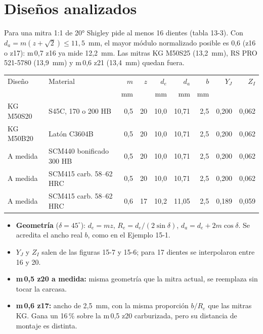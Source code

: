 \documentclass[11pt,a4paper]{article}
\begin{document}
\section{Diseños analizados}
Para una mitra 1:1 de 20° Shigley pide al menos 16 dientes (tabla 13-3). Con $d_a=m(z+\sqrt2)\le11{,}5$~mm,
el mayor módulo normalizado posible es 0,6 (z16 o z17): m\,0,7 z16 ya mide 12,2~mm. Las mitras KG M50S25 (13,2~mm),
RS PRO 521-5780 (13,9~mm) y m\,0,6 z21 (13,4~mm) quedan fuera.

\begin{table}[H]\centering\small\setlength{\tabcolsep}{4pt}
\begin{tabular}{l l r r r r r r r}
\toprule
Diseño & Material & $m$ & $z$ & $d_e$ & $d_a$ & $b$ & $Y_J$ & $Z_I$\\
 & & mm & & mm & mm & mm & & \\
\midrule
KG M50S20 & S45C, 170 o 200 HB & 0,5 & 20 & 10,0 & 10,71 & 2,5 & 0,200 & 0,062\\
KG M50B20 & Latón C3604B & 0,5 & 20 & 10,0 & 10,71 & 2,5 & 0,200 & 0,062\\
A medida & SCM440 bonificado 300 HB & 0,5 & 20 & 10,0 & 10,71 & 2,5 & 0,200 & 0,062\\
A medida & SCM415 carb. 58--62 HRC & 0,5 & 20 & 10,0 & 10,71 & 2,5 & 0,200 & 0,062\\
A medida & SCM415 carb. 58--62 HRC & 0,6 & 17 & 10,2 & 11,05 & 2,5 & 0,189 & 0,059\\
\bottomrule
\end{tabular}
\end{table}

\begin{itemize}
  \item \textbf{Geometría} ($\delta=45^\circ$): $d_e=mz$, $R_e=d_e/(2\sin\delta)$, $d_a=d_e+2m\cos\delta$.
        Se acredita el ancho real $b$, como en el Ejemplo 15-1.
  \item $Y_J$ y $Z_I$ salen de las figuras 15-7 y 15-6; para 17 dientes se interpolaron entre 16 y 20.
  \item \textbf{m\,0,5 z20 a medida:} misma geometría que la mitra actual, se reemplaza sin tocar la carcasa.
  \item \textbf{m\,0,6 z17:} ancho de 2,5~mm, con la misma proporción $b/R_e$ que las mitras KG. Gana un 16\,\% sobre la
        m\,0,5 z20 carburizada, pero su distancia de montaje es distinta.
\end{itemize}
\end{document}
